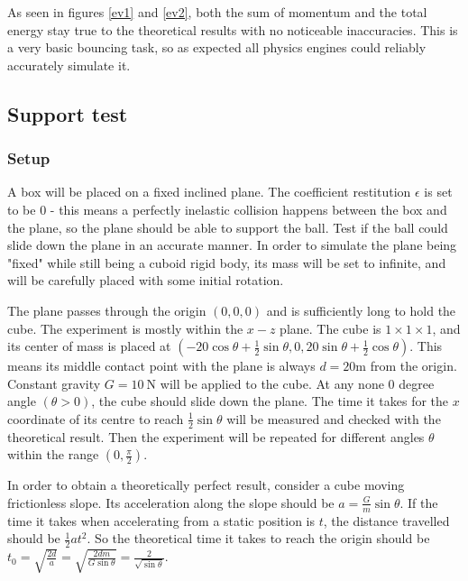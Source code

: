 \documentclass[12pt,a4paper,twoside,openright]{report}
\begin{document}
As seen in figures \ref{ev1} and \ref{ev2}, both the sum of momentum and the total energy stay true to the theoretical results with no noticeable inaccuracies. This is a very basic bouncing task, so as expected all physics engines could reliably accurately simulate it.

\subsection{Support test}

\subsubsection{Setup}

A box will be placed on a fixed inclined plane. The coefficient restitution $\epsilon$ is set to be $0$ - this means a perfectly inelastic collision happens between the box and the plane, so the plane should be able to support the ball. Test if the ball could slide down the plane in an accurate manner. In order to simulate the plane being "fixed" while still being a cuboid rigid body, its mass will be set to infinite, and will be carefully placed with some initial rotation.

The plane passes through the origin $(0, 0, 0)$ and is sufficiently long to hold the cube. The experiment is mostly within the $x-z$ plane. The cube is $1 \times 1 \times 1$, and its center of mass is placed at $(-20\cos \theta + \frac{1}{2}\sin \theta, 0, 20\sin\theta+\frac{1}{2}\cos \theta)$. This means its middle contact point with the plane is always $d=20$m from the origin. Constant gravity $G = \SI{10}{\N}$ will be applied to the cube. At any none $0$ degree angle $(\theta > 0)$, the cube should slide down the plane. The time it takes for the $x$ coordinate of its centre to reach $\frac{1}{2}\sin \theta$ will be measured and checked with the theoretical result. Then the experiment will be repeated for different angles $\theta$ within the range $(0, \frac{\pi}{2})$.

In order to obtain a theoretically perfect result, consider a cube moving frictionless slope. Its acceleration along the slope should be $a=\frac{G}{m}\sin \theta$. If the time it takes when accelerating from a static position is $t$, the distance travelled should be $\frac{1}{2}at^2$. So the theoretical time it takes to reach the origin should be $t_0=\sqrt{\frac{2d}{a}}=\sqrt{\frac{2dm}{G\sin \theta}}=\frac{2}{\sqrt{\sin\theta}}$.

\begin{center}
\end{center}
\end{document}
